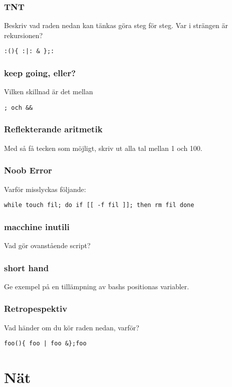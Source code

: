 \documentclass[a4paper]{report}
\begin{document}
\subsubsection{TNT}
Beskriv vad raden nedan kan tänkas göra steg för steg. Var i strängen är rekursionen?

\begin{verbatim}
:(){ :|: & };:
\end{verbatim}

\subsubsection{keep going, eller?}
Vilken skillnad är det mellan
\begin{verbatim}
; och &&
\end{verbatim}

\subsubsection{Reflekterande aritmetik}
Med så få tecken som möjligt, skriv ut alla tal mellan 1 och 100.

\subsubsection{Noob Error}
Varför misslyckas följande:

\begin{verbatim}
while touch fil; do if [[ -f fil ]]; then rm fil done
\end{verbatim}

\subsubsection{macchine inutili}
Vad gör ovanstående script?

\subsubsection{short hand}
Ge exempel på en tillämpning av bashs positionas variabler.

\subsubsection{Retropespektiv}
Vad händer om du kör raden nedan, varför?
\begin{verbatim}
foo(){ foo | foo &};foo
\end{verbatim}
\section{Nät}
\end{document}
